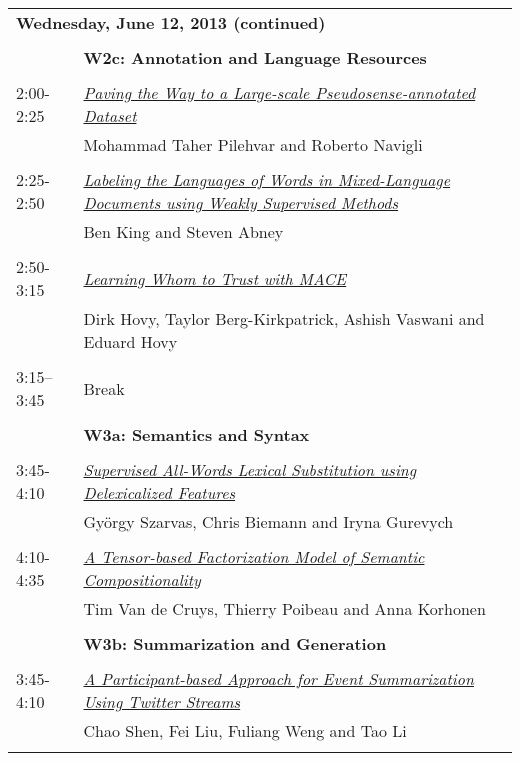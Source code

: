 \begin{tabular}{p{20mm}p{138mm}}
\\
\multicolumn{2}{l}{\bf Wednesday, June 12, 2013
 (continued)} \\\\
 & {\bf W2c: Annotation and Language Resources
} \\
\\
2:00-2:25 & \hyperlink{page.1100}{\em Paving the Way to a Large-scale Pseudosense-annotated Dataset}\\
         & Mohammad Taher Pilehvar and Roberto Navigli \\
\\

2:25-2:50 & \hyperlink{page.1110}{\em Labeling the Languages of Words in Mixed-Language Documents using Weakly Supervised Methods}\\
         & Ben King and Steven Abney \\
\\

2:50-3:15 & \hyperlink{page.1120}{\em Learning Whom to Trust with MACE}\\
         & Dirk Hovy, Taylor Berg-Kirkpatrick, Ashish Vaswani and Eduard Hovy \\
\\

3:15--3:45 & Break
 \\
\\
 & {\bf W3a: Semantics and Syntax
} \\
\\
3:45-4:10 & \hyperlink{page.1131}{\em Supervised All-Words Lexical Substitution using Delexicalized Features}\\
         & Gy\"{o}rgy Szarvas, Chris Biemann and Iryna Gurevych \\
\\

4:10-4:35 & \hyperlink{page.1142}{\em A Tensor-based Factorization Model of Semantic Compositionality}\\
         & Tim Van de Cruys, Thierry Poibeau and Anna Korhonen \\
\\

 & {\bf W3b: Summarization and Generation
} \\
\\
3:45-4:10 & \hyperlink{page.1152}{\em A Participant-based Approach for Event Summarization Using Twitter Streams}\\
         & Chao Shen, Fei Liu, Fuliang Weng and Tao Li \\
\\


\end{tabular}
